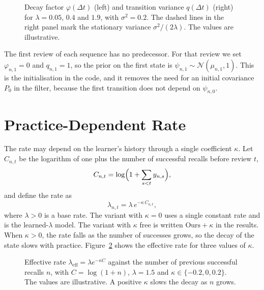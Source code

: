 \begin{figure}[htbp]
  \centering
  
  \caption{Decay factor $\varphi(\Delta t)$ (left) and transition variance $q(\Delta t)$ (right) for
    $\lambda = 0.05$, $0.4$ and $1.9$, with $\sigma^2 = 0.2$. The dashed lines in the right panel
    mark the stationary variance $\sigma^2/(2\lambda)$. The values are illustrative.}
  \label{fig:tk_phi_q}
\end{figure}

The first review of each sequence has no predecessor. For that review we set $\varphi_{n,1} = 0$
and $q_{n,1} = 1$, so the prior on the first state is $\psi_{n,1} \sim \mathcal N(\mu_{n,1}, 1)$.
This is the initialisation in the code, and it removes the need for an initial covariance $P_0$ in
the filter, because the first transition does not depend on $\psi_{n,0}$.

\section{Practice-Dependent Rate}
\label{sec:method-kappa}

The rate may depend on the learner's history through a single coefficient $\kappa$. Let $C_{n,t}$
be the logarithm of one plus the number of successful recalls before review $t$,
\begin{equation}\label{eq:C}
  C_{n,t} = \log\Bigl(1 + \sum_{s < t} y_{n,s}\Bigr),
\end{equation}
and define the rate as
\begin{equation}\label{eq:rate}
  \lambda_{n,t} = \lambda\,e^{-\kappa\,C_{n,t}},
\end{equation}
where $\lambda > 0$ is a base rate. The variant with $\kappa = 0$ uses a single constant rate and is
the learned-$\lambda$ model. The variant with $\kappa$ free is written $\text{Ours}+\kappa$ in the
results. When $\kappa > 0$, the rate falls as the number of successes grows, so the decay of the
state slows with practice. Figure~\ref{fig:tk_kappa_rate} shows the effective rate for three values
of $\kappa$.

\begin{figure}[htbp]
  \centering
  
  \caption{Effective rate $\lambda_{\mathrm{eff}} = \lambda e^{-\kappa C}$ against the number of
    previous successful recalls $n$, with $C = \log(1+n)$, $\lambda = 1.5$ and
    $\kappa \in \{-0.2, 0, 0.2\}$. The values are illustrative. A positive $\kappa$ slows the decay
    as $n$ grows.}
  \label{fig:tk_kappa_rate}
\end{figure}

